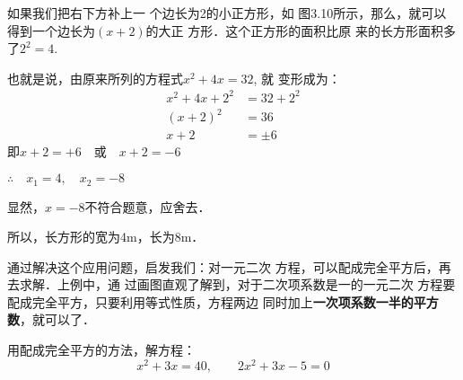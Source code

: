 如果我们把右下方补上一
个边长为2的小正方形，如
图3.10所示，那么，就可以
得到一个边长为$(x+2)$的大正
方形．这个正方形的面积比原
来的长方形面积多了$2^2=4$.
\begin{figure}[htp]
    \centering
    \caption{}
\end{figure}


也就是说，由原来所列的方程式$x^2+4x=32$, 就
变形成为：
\[\begin{split}
    x^2+4x+2^2&=32+2^2\\
    (x+2)^2&=36\\
    x+2&=\pm 6
\end{split}\]
即$x+2=+6\quad \text{或}\quad x+2=-6$

$\therefore\quad x_1=4,\quad x_2=-8$

显然，$x=-8$不符合题意，应舍去．

所以，长方形的宽为4m，长为8m．

通过解决这个应用问题，启发我们：对一元二次
方程，可以配成完全平方后，再去求解．上例中，通
过画图直观了解到，对于二次项系数是一的一元二次
方程要配成完全平方，只要利用等式性质，方程两边
同时加上\textbf{一次项系数一半的平方数}，就可以了．

\begin{example}
    用配成完全平方的方法，解方程：
\[x^2+3x=40,\qquad 2x^2+3x-5=0 \]
\end{example}

